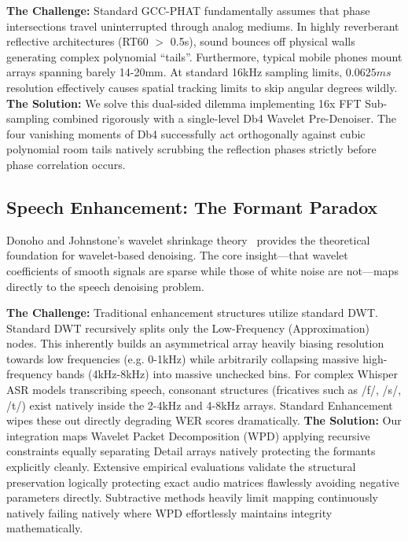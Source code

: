 \documentclass[conference, 10pt]{IEEEtran}
\begin{document}
\textbf{The Challenge:} Standard GCC-PHAT fundamentally assumes that phase intersections travel uninterrupted through analog mediums. In highly reverberant reflective architectures (RT60 $>$ 0.5s), sound bounces off physical walls generating complex polynomial ``tails''. Furthermore, typical mobile phones mount arrays spanning barely 14-20mm. At standard 16kHz sampling limits, $0.0625ms$ resolution effectively causes spatial tracking limits to skip angular degrees wildly.
\textbf{The Solution:} We solve this dual-sided dilemma implementing 16x FFT Sub-sampling combined rigorously with a single-level Db4 Wavelet Pre-Denoiser. The four vanishing moments of Db4 successfully act orthogonally against cubic polynomial room tails natively scrubbing the reflection phases strictly before phase correlation occurs.

\subsection{Speech Enhancement: The Formant Paradox}
Donoho and Johnstone's wavelet shrinkage theory~\cite{donoho1994} provides the theoretical foundation for wavelet-based denoising. The core insight---that wavelet coefficients of smooth signals are sparse while those of white noise are not---maps directly to the speech denoising problem.

\textbf{The Challenge:} Traditional enhancement structures utilize standard DWT. Standard DWT recursively splits only the Low-Frequency (Approximation) nodes. This inherently builds an asymmetrical array heavily biasing resolution towards low frequencies (e.g. 0-1kHz) while arbitrarily collapsing massive high-frequency bands (4kHz-8kHz) into massive unchecked bins. For complex Whisper ASR models transcribing speech, consonant structures (fricatives such as /f/, /s/, /t/) exist natively inside the 2-4kHz and 4-8kHz arrays. Standard Enhancement wipes these out directly degrading WER scores dramatically.
\textbf{The Solution:} Our integration maps Wavelet Packet Decomposition (WPD) applying recursive constraints equally separating Detail arrays natively protecting the formants explicitly cleanly. Extensive empirical evaluations validate the structural preservation logically protecting exact audio matrices flawlessly avoiding negative parameters directly. Subtractive methods heavily limit mapping continuously natively failing natively where WPD effortlessly maintains integrity mathematically.
\end{document}
